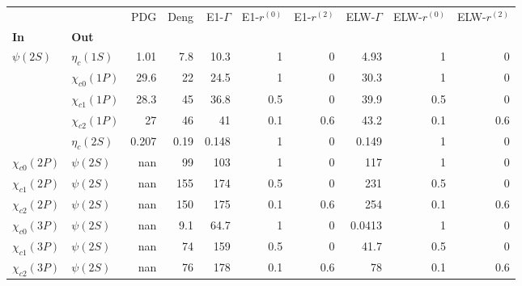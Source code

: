 \begin{tabular}{l|l|r|r|r|r|r|r|r|r}
\toprule
                &            &   PDG &  Deng &  E1-$\Gamma$ &  E1-$r^{(0)}$ &  E1-$r^{(2)}$ &  ELW-$\Gamma$ &  ELW-$r^{(0)}$ &  ELW-$r^{(2)}$ \\
\textbf{In} & \textbf{Out} &       &       &              &               &               &               &                &                \\
\midrule
\textbf{$\psi(2S)$} & \textbf{$\eta_{c}(1S)$} &  1.01 &   7.8 &         10.3 &             1 &             0 &          4.93 &              1 &              0 \\
                & \textbf{$\chi_{c0}(1P)$} &  29.6 &    22 &         24.5 &             1 &             0 &          30.3 &              1 &              0 \\
                & \textbf{$\chi_{c1}(1P)$} &  28.3 &    45 &         36.8 &           0.5 &             0 &          39.9 &            0.5 &              0 \\
                & \textbf{$\chi_{c2}(1P)$} &    27 &    46 &           41 &           0.1 &           0.6 &          43.2 &            0.1 &            0.6 \\
                & \textbf{$\eta_{c}(2S)$} & 0.207 &  0.19 &        0.148 &             1 &             0 &         0.149 &              1 &              0 \\
\textbf{$\chi_{c0}(2P)$} & \textbf{$\psi(2S)$} &   nan &    99 &          103 &             1 &             0 &           117 &              1 &              0 \\
\textbf{$\chi_{c1}(2P)$} & \textbf{$\psi(2S)$} &   nan &   155 &          174 &           0.5 &             0 &           231 &            0.5 &              0 \\
\textbf{$\chi_{c2}(2P)$} & \textbf{$\psi(2S)$} &   nan &   150 &          175 &           0.1 &           0.6 &           254 &            0.1 &            0.6 \\
\textbf{$\chi_{c0}(3P)$} & \textbf{$\psi(2S)$} &   nan &   9.1 &         64.7 &             1 &             0 &        0.0413 &              1 &              0 \\
\textbf{$\chi_{c1}(3P)$} & \textbf{$\psi(2S)$} &   nan &    74 &          159 &           0.5 &             0 &          41.7 &            0.5 &              0 \\
\textbf{$\chi_{c2}(3P)$} & \textbf{$\psi(2S)$} &   nan &    76 &          178 &           0.1 &           0.6 &            78 &            0.1 &            0.6 \\
\bottomrule
\end{tabular}
